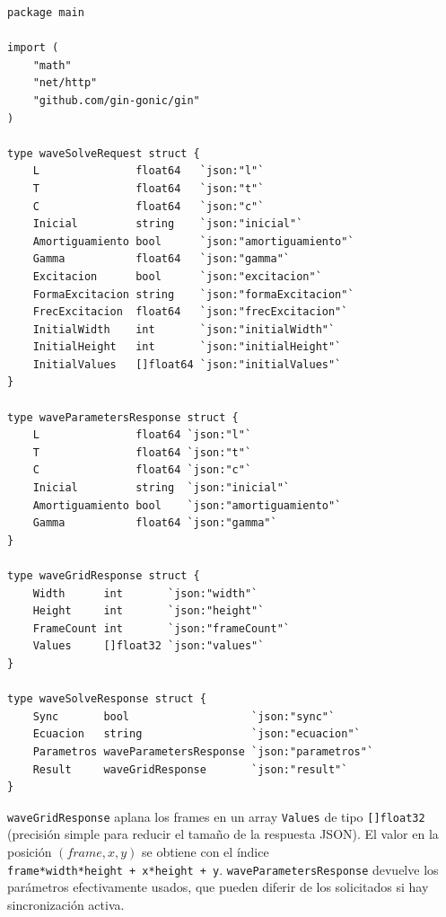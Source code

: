 \documentclass[12pt, a4paper]{article}
\begin{document}
\begin{lstlisting}[style=golang, caption={\texttt{wave\_api.go} — estructuras de entrada y salida}]
package main

import (
    "math"
    "net/http"
    "github.com/gin-gonic/gin"
)

type waveSolveRequest struct {
    L               float64   `json:"l"`
    T               float64   `json:"t"`
    C               float64   `json:"c"`
    Inicial         string    `json:"inicial"`
    Amortiguamiento bool      `json:"amortiguamiento"`
    Gamma           float64   `json:"gamma"`
    Excitacion      bool      `json:"excitacion"`
    FormaExcitacion string    `json:"formaExcitacion"`
    FrecExcitacion  float64   `json:"frecExcitacion"`
    InitialWidth    int       `json:"initialWidth"`
    InitialHeight   int       `json:"initialHeight"`
    InitialValues   []float64 `json:"initialValues"`
}

type waveParametersResponse struct {
    L               float64 `json:"l"`
    T               float64 `json:"t"`
    C               float64 `json:"c"`
    Inicial         string  `json:"inicial"`
    Amortiguamiento bool    `json:"amortiguamiento"`
    Gamma           float64 `json:"gamma"`
}

type waveGridResponse struct {
    Width      int       `json:"width"`
    Height     int       `json:"height"`
    FrameCount int       `json:"frameCount"`
    Values     []float32 `json:"values"`
}

type waveSolveResponse struct {
    Sync       bool                   `json:"sync"`
    Ecuacion   string                 `json:"ecuacion"`
    Parametros waveParametersResponse `json:"parametros"`
    Result     waveGridResponse       `json:"result"`
}
\end{lstlisting}

\texttt{waveGridResponse} aplana los frames en un array \texttt{Values} de tipo
\texttt{[]float32} (precisión simple para reducir el tamaño de la respuesta JSON). El
valor en la posición $(frame, x, y)$ se obtiene con el índice\\
\texttt{frame*width*height + x*height + y}.
\texttt{waveParametersResponse} devuelve los parámetros efectivamente usados, que
pueden diferir de los solicitados si hay sincronización activa.
\end{document}
